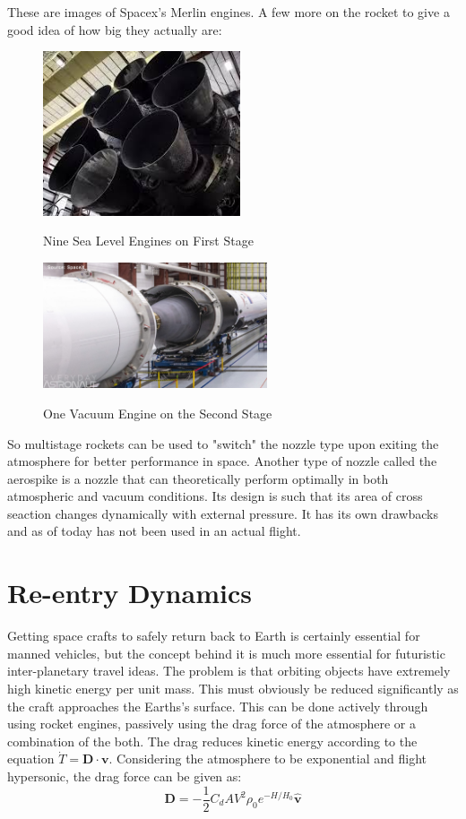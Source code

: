\documentclass[12pt, letterpaper]{article}
\begin{document}
These are images of Spacex's Merlin engines. A few more on the rocket to give a good idea of how big they actually are:

\begin{figure}[ht]
	\centering
    \includegraphics[width = 220px]{nineboosters}
    \label{fig:nineboosters}
    \caption{Nine Sea Level Engines on First Stage}
\end{figure}

\begin{figure}[ht]
	\centering
    \includegraphics[width = 250px]{vacuumnozzle}
    \label{fig:vacuumnozzle}
    \caption{One Vacuum Engine on the Second Stage}
\end{figure}

So multistage rockets can be used to "switch" the nozzle type upon exiting the atmosphere for better performance in space. Another type of nozzle called the aerospike is a nozzle that can theoretically perform optimally in both atmospheric and vacuum conditions. Its design is such that its area of cross seaction changes dynamically with external pressure. It has its own drawbacks and as of today has not been used in an actual flight.

\newpage

\section{Re-entry Dynamics}
Getting space crafts to safely return back to Earth is certainly essential for manned vehicles, but the concept behind it is much more essential for futuristic inter-planetary travel ideas. The problem is that orbiting objects have extremely high kinetic energy per unit mass. This must obviously be reduced significantly as the craft approaches the Earths's surface. This can be done actively through using rocket engines, passively using the drag force of the atmosphere or a combination of the both. The drag reduces kinetic energy according to the equation $\Dot{T} = \mathbf{D} \cdot \mathbf{v}$. Considering the atmosphere to be exponential and flight hypersonic, the drag force can be given as: 
\[
	\mathbf{D} = - \frac{1}{2} C_d A V^2 \rho_0 e ^ {-H/H_0} \hat{\mathbf{v}}
\]
\end{document}
